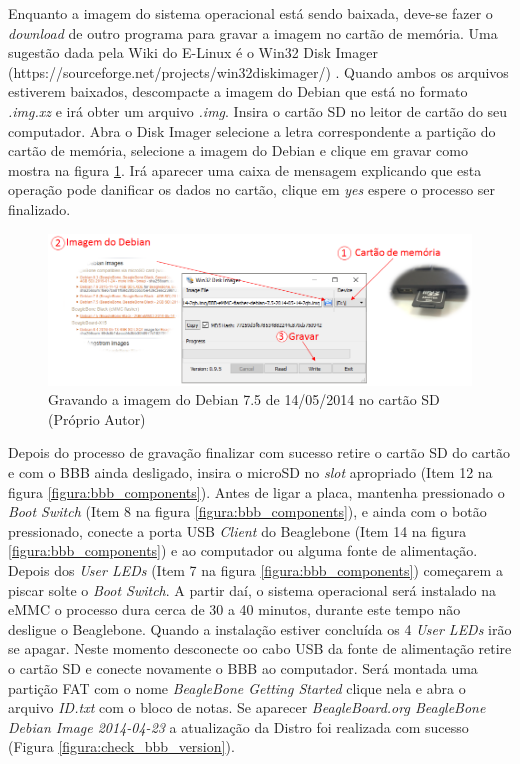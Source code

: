 Enquanto a imagem do sistema operacional está sendo baixada, deve-se fazer o \emph{download} de outro programa para gravar a imagem no cartão de memória. Uma sugestão dada pela Wiki do E-Linux é o Win32 Disk Imager (https://sourceforge.net/projects/win32diskimager/) \cite{elinuxupdatebbb}. Quando ambos os arquivos estiverem baixados, descompacte a imagem do Debian que está no formato \emph{.img.xz} e irá obter um arquivo \emph{.img}. Insira o cartão SD no leitor de cartão do seu computador. Abra o Disk Imager selecione a letra correspondente a partição do cartão de memória, selecione a imagem do Debian e clique em gravar como mostra na figura \ref{figura:update_bbb}. Irá aparecer uma caixa de mensagem explicando que esta operação pode danificar os dados no cartão, clique em \emph{yes} espere o processo ser finalizado.

\begin{figure}[h]
	\centering
	\includegraphics[width=\textwidth]{figuras/update_bbb.png}
	\caption{Gravando a imagem do Debian 7.5 de 14/05/2014 no cartão SD (Próprio Autor)}
	\label{figura:update_bbb}
\end{figure}

Depois do processo de gravação finalizar com sucesso retire o cartão SD do cartão e com o BBB ainda desligado, insira o microSD no \emph{slot} apropriado (Item 12 na figura \ref{figura:bbb_components}). Antes de ligar a placa, mantenha pressionado o \emph{Boot Switch} (Item 8 na figura \ref{figura:bbb_components}), e ainda com o botão pressionado, conecte a porta USB \emph{Client} do Beaglebone (Item 14 na figura \ref{figura:bbb_components}) e ao computador ou alguma fonte de alimentação. Depois dos \emph{User LEDs} (Item 7 na figura \ref{figura:bbb_components}) começarem a piscar solte o \emph{Boot Switch}. A partir daí, o sistema operacional será instalado na eMMC o processo dura cerca de 30 a 40 minutos, durante este tempo não desligue o Beaglebone. Quando a instalação estiver concluída os 4 \emph{User LEDs} irão se apagar. Neste momento desconecte oo cabo USB da fonte de alimentação retire o cartão SD e conecte novamente o BBB ao computador. Será montada uma partição FAT com o nome \emph{BeagleBone Getting Started} clique nela e abra o arquivo \emph{ID.txt} com o bloco de notas. Se aparecer \emph{BeagleBoard.org BeagleBone Debian Image 2014-04-23
} a atualização da Distro foi realizada com sucesso (Figura \ref{figura:check_bbb_version}).

